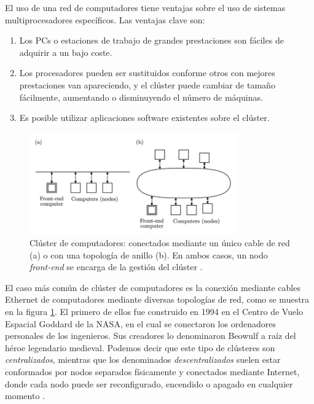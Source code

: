\vspace{10pt}
El uso de una red de computadores tiene ventajas sobre el uso de sistemas multiprocesadores específicos. Las ventajas
clave son:
\begin{enumerate}
    \item Los PCs o estaciones de trabajo de grandes prestaciones son fáciles de adquirir a un bajo coste.
    \item Los procesadores pueden ser sustituidos conforme otros con mejores prestaciones van apareciendo, y el clúster 
    puede cambiar de tamaño fácilmente, aumentando o disminuyendo el número de máquinas.
    \item Es posible utilizar aplicaciones software existentes sobre el clúster.
\end{enumerate}
\begin{figure}[htbp!]
    \centering
    \includegraphics[width=0.8\textwidth]{img/cluster.png}
    \caption{Clúster de computadores: conectados mediante un único cable de red (a) o con una topología de anillo (b). En ambos casos, un nodo \textit{front-end} se encarga de la gestión del clúster \cite{czech_2017}.}
    \label{fig:cluster}
\end{figure}

\vspace{10pt}
El caso más común de clúster de computadores es la conexión mediante cables Ethernet de computadores mediante diversas
topologías de red, como se muestra en la figura \ref{fig:cluster}. El primero de ellos fue construido en 1994 en el 
Centro de Vuelo Espacial Goddard de la NASA, en el cual se conectaron los ordenadores personales de los ingenieros. 
Sus creadores lo denominaron Beowulf a raíz del héroe legendario medieval. Podemos decir que este tipo de clústeres 
son \textit{centralizados}, mientras que los denominados \textit{descentralizados} suelen estar conformados por nodos 
separados físicamente y conectados mediante Internet, donde cada nodo puede ser reconfigurado, encendido o apagado en 
cualquier momento \cite{czech_2017}.

